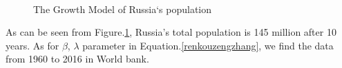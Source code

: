     \begin{figure}[!htbp]                                       %
        \centering
        \qquad
        \\ %

        \caption{The Growth Model of Russia`s population}                                        %
        \label{eluosibijiaotu}                                           %
    \end{figure}

As can be seen from Figure.\ref{eluosibijiaotu}, Russia's total population is 145 million after 10 years. As for $\beta $, $\lambda $ parameter in Equation.\ref{renkouzengzhang}, we find the data from 1960 to 2016 in World bank.

